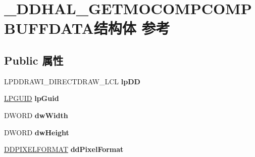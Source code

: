 \hypertarget{struct___d_d_h_a_l___g_e_t_m_o_c_o_m_p_c_o_m_p_b_u_f_f_d_a_t_a}{}\section{\+\_\+\+D\+D\+H\+A\+L\+\_\+\+G\+E\+T\+M\+O\+C\+O\+M\+P\+C\+O\+M\+P\+B\+U\+F\+F\+D\+A\+T\+A结构体 参考}
\label{struct___d_d_h_a_l___g_e_t_m_o_c_o_m_p_c_o_m_p_b_u_f_f_d_a_t_a}
\subsection*{Public 属性}
\begin{DoxyCompactItemize}
\item 
\mbox{\label{struct___d_d_h_a_l___g_e_t_m_o_c_o_m_p_c_o_m_p_b_u_f_f_d_a_t_a_af6c55094855643b0510fab7fa1d97bce}} 
L\+P\+D\+D\+R\+A\+W\+I\+\_\+\+D\+I\+R\+E\+C\+T\+D\+R\+A\+W\+\_\+\+L\+CL {\bfseries lp\+DD}
\item 
\mbox{\label{struct___d_d_h_a_l___g_e_t_m_o_c_o_m_p_c_o_m_p_b_u_f_f_d_a_t_a_a9c6b30ee946dd176e1d09ee8ebe4c1e0}} 
\hyperlink{interface_g_u_i_d}{L\+P\+G\+U\+ID} {\bfseries lp\+Guid}
\item 
\mbox{\label{struct___d_d_h_a_l___g_e_t_m_o_c_o_m_p_c_o_m_p_b_u_f_f_d_a_t_a_a3b8211e16c64b13fe4cdac1f7e6f5d6c}} 
D\+W\+O\+RD {\bfseries dw\+Width}
\item 
\mbox{\label{struct___d_d_h_a_l___g_e_t_m_o_c_o_m_p_c_o_m_p_b_u_f_f_d_a_t_a_a14a2a3c37da648a6c808c3577ac9d53a}} 
D\+W\+O\+RD {\bfseries dw\+Height}
\item 
\mbox{\label{struct___d_d_h_a_l___g_e_t_m_o_c_o_m_p_c_o_m_p_b_u_f_f_d_a_t_a_a763c2c315b983544612106fe95eba238}} 
\hyperlink{struct___d_d_p_i_x_e_l_f_o_r_m_a_t}{D\+D\+P\+I\+X\+E\+L\+F\+O\+R\+M\+AT} {\bfseries dd\+Pixel\+Format}
\item 
\mbox{\label{struct___d_d_h_a_l___g_e_t_m_o_c_o_m_p_c_o_m_p_b_u_f_f_d_a_t_a_a24279c2ec65167123bcd38d044b378a6}} 

\end{DoxyCompactItemize}
